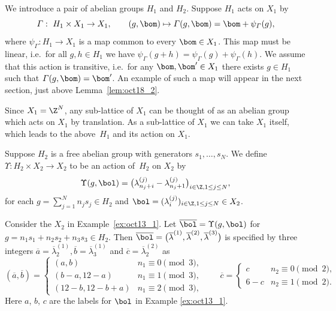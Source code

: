 We introduce a pair of abelian groups $H_1$ and $H_2$.
Suppose $H_1$ acts on $X_1$
by
\begin{displaymath}
\varGamma : \ H_1 \times X_1 \rightarrow X_1, \qquad
(g , \bom) \mapsto \varGamma (g , \bom) = \bom + \psi_{\varGamma} (g),
\end{displaymath}
where $\psi_{\varGamma}: H_1 \rightarrow X_1$ is a map common to every $\bom \in X_1$.
This map must be linear, i.e.~for all $g, h \in H_1$ we have $\psi_{\varGamma}(g+h) = \psi_{\varGamma}(g) + \psi_{\varGamma}(h)$.
We assume that this action is transitive, i.e.~for any $\bom, \bom' \in X_1$ there exists $g \in H_1$ such that $\varGamma (g , \bom) = \bom'$.
An example of such a map will appear in the next section, just above Lemma~\ref{lem:oct18_2}.
\begin{remark}
Since $X_1 = \Z^N$, any sub-lattice of $X_1$ can be thought of as an abelian group which
acts on $X_1$ by translation.
As a sub-lattice of $X_1$ we can take $X_1$ itself, which leads to the above~$H_1$ and its action on $X_1$.
\end{remark}

Suppose $H_2$ is a free abelian group with generators $s_1, \ldots , s_N$.
We def\/ine $\Upsilon: H_2 \times X_2 \rightarrow X_2$ to be an action of~$H_2$ on $X_2$ by
\begin{equation}\label{eq:mar24_1}
\Upsilon (g,\bol) = \big(\lambda^{(j)}_{n_j + i}- \lambda^{(j)}_{n_j + 1}\big)_{i \in \Z, 1 \leq j \leq N},
\end{equation}
for each $g = \sum_{j=1}^N n_j s_j\in H_2$ and
$\bol = (\lambda^{(j)}_i)_{i \in \Z, 1 \leq j \leq N} \in X_2$.

\begin{example}\label{ex:oct15_1}
Consider the $X_2$ in Example~\ref{ex:oct13_1}.
Let $\overline{\bol} = \Upsilon (g,\bol)$
for $g = n_1 s_1 + n_2 s_2 + n_3 s_3 \in H_2$.
Then
$\overline{\bol} = \big(\overline{\lambda}^{(1)}, \overline{\lambda}^{(2)},\overline{\lambda}^{(3)}\big)$ is specif\/ied by three integers
$\overline{a}=\overline{\lambda}^{(1)}_2, \overline{b}=\overline{\lambda}^{(1)}_3$
and $\overline{c}=\overline{\lambda}^{(2)}_2$ as
\begin{equation*}
(\overline{a}, \overline{b}) =
\begin{cases}
(a,b) & n_1 \equiv 0 \pmod{3},\\
(b-a, 12-a) & n_1 \equiv 1 \pmod{3},\\
(12-b, 12-b+a) & n_1 \equiv 2 \pmod{3},
\end{cases}
\qquad
\overline{c} =
\begin{cases}
c & n_2 \equiv 0 \pmod{2},\\
6-c & n_2 \equiv 1 \pmod{2}.
\end{cases}
\end{equation*}
Here $a$, $b$, $c$ are the labels for $\bol$ in Example \ref{ex:oct13_1}.
\end{example}



